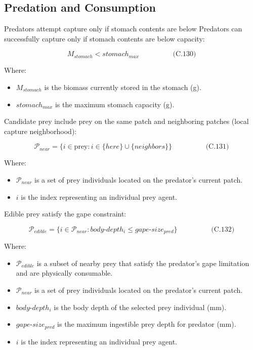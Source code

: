 \documentclass[
]{book}
\providecommand{\tightlist}{%
  \setlength{\itemsep}{0pt}\setlength{\parskip}{0pt}}
\begin{document}
\subsection{Predation and Consumption}\label{predation-and-consumption}

Predators attempt capture only if stomach contents are below Predators can successfully capture only if stomach contents are below
capacity:

\[
\begin{equation} M_{stomach} < stomach_{max}  \hspace{2cm} \text{(C.130)} \end{equation}
\]

Where:

\begin{itemize}
\tightlist
\item
  \(M_{stomach}\) is the biomass currently stored in the stomach (g).
\item
  \(stomach_{max}\) is the maximum stomach capacity (g).
\end{itemize}

Candidate prey include prey on the same patch and neighboring patches
(local capture neighborhood):

\[
\begin{equation} \mathcal{P}_{near} = \{i \in \text{prey} : i \in \{here\} \cup \{neighbors\}\}  \hspace{2cm} \text{(C.131)} \end{equation}
\]

Where:

\begin{itemize}
\tightlist
\item
  \(\mathcal{P}_{near}\) is a set of prey individuals located on the
  predator's current patch.
\item
  \(i\) is the index representing an individual prey agent.
\end{itemize}

Edible prey satisfy the gape constraint:

\[
\begin{equation} \mathcal{P}_{edible} = \{i \in \mathcal{P}_{near} : body\text{-}depth_i \le gape\text{-}size_{pred}\}  \hspace{2cm} \text{(C.132)} \end{equation}
\]

Where:

\begin{itemize}
\tightlist
\item
  \(\mathcal{P}_{edible}\) is a subset of nearby prey that satisfy the
  predator's gape limitation and are physically consumable.
\item
  \(\mathcal{P}_{near}\) is a set of prey individuals located on the
  predator's current patch.
\item
  \(body\text{-}depth_i\) is the body depth of the selected prey
  individual (mm).
\item
  \(gape\text{-}size_{pred}\) is the maximum ingestible prey depth for
  predator (mm).
\item
  \(i\) is the index representing an individual prey agent.
\end{itemize}
\end{document}
